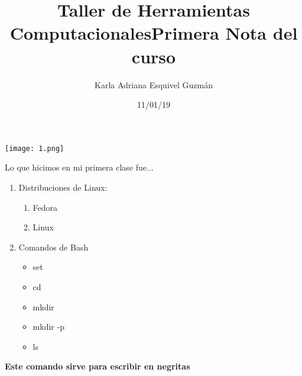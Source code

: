 \documentclass[letterpaper, 12pt, oneside]{article}%
\title{\Huge Taller de Herramientas Computacionales}
\author{Karla Adriana Esquivel Guzmán}%
\date{11/01/19}%
\begin{document}
\maketitle
\begin{center}%
\texttt{[image: 1.png]}
\end{center}%
\newpage%

\title{\Huge Primera Nota del curso\\}%

Lo que hicimos en mi primera clase fue...%
\begin{enumerate}%
	\item Distribuciones de Linux: %
	\begin{enumerate}%
		\item Fedora
		\item Linux
	\end{enumerate}%
	\item Comandos de Bash%
	\begin{itemize}%
		\item set
		\item cd
		\item mkdir
		\item mkdir -p
		\item ls
	\end{itemize}%
\end{enumerate}%
\textbf{Este comando sirve para escribir en negritas}
\end{document}
